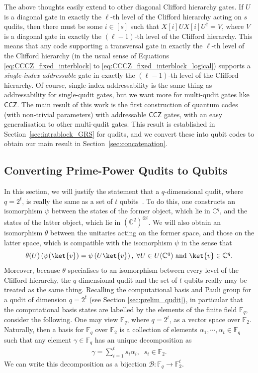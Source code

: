 \documentclass[11pt]{article}
\theoremstyle{definition}
\newcommand{\CCZ}{\mathsf{CCZ}}
\newcommand{\al}{\alpha}
\newcommand{\FF}{\mathbb{F}}
\newcommand{\B}{\mathcal{B}}
\begin{document}
The above thoughts easily extend to other diagonal Clifford hierarchy gates. If $U$ is a diagonal gate in exactly the $\ell$-th level of the Clifford hierarchy acting on $s$ qudits, then there must be some $i \in [s]$ such that $X[i]UX[i]U^\dagger = V$, where $V$ is a diagonal gate in exactly the $(\ell-1)$-th level of the Clifford hierarchy. This means that any code supporting a transversal gate in exactly the $\ell$-th level of the Clifford hierarchy (in the usual sense of Equations \eqref{eq:CCCZ_fixed_interblock} to \eqref{eq:CCCZ_fixed_interblock_logical}) supports a \textit{single-index addressable} gate in exactly the $(\ell-1)$-th level of the Clifford hierarchy. Of course, single-index addressability is the same thing as addressability for single-qudit gates, but we want more for multi-qudit gates like $\CCZ$. The main result of this work is the first construction of quantum codes (with non-trivial parameters) with addressable $\CCZ$ gates, with an easy generalisation to other multi-qudit gates. This result is established in Section~\ref{sec:intrablock_GRS} for qudits, and we convert these into qubit codes to obtain our main result in Section~\ref{sec:concatenation}.

\subsection{Converting Prime-Power Qudits to Qubits}\label{sec:qudit_to_qubit_prelim}

In this section, we will justify the statement that a $q$-dimensional qudit, where $q=2^t$, is really the same as a set of $t$ qubits~\cite{gottesman2016surviving}. To do this, one constructs an isomorphism $\psi$ between the states of the former object, which lie in $\mathbb{C}^q$, and the states of the latter object, which lie in $(\mathbb{C}^2)^{\otimes t}$. We will also obtain an isomorphism $\theta$ between the unitaries acting on the former space, and those on the latter space, which is compatible with the isomorphism $\psi$ in the sense that
\begin{equation}
    \theta(U)\left(\psi(\ket{v}\right) = \psi\left(U\ket{v}\right), \; \forall U \in U(\mathbb{C}^q) \text{ and } \ket{v} \in \mathbb{C}^q.
\end{equation}
Moreover, because $\theta$ specialises to an isomorphism between every level of the Clifford hierarchy, the $q$-dimensional qudit and the set of $t$ qubits really may be treated as the same thing. Recalling the computational basis and Pauli group for a qudit of dimension $q=2^t$ (see Section \ref{sec:prelim_qudit}), in particular that the computational basis states are labelled by the elements of the finite field $\mathbb{F}_q$, consider the following. One may view $\FF_q$, where $q = 2^t$, as a vector space over $\FF_2$. Naturally, then a basis for $\FF_q$ over $\FF_2$ is a collection of elements $\al_1,\cdots, \al_t\in \FF_q$ such that any element $\gamma\in \FF_q$ has an unique decomposition as 
\begin{align}
    \gamma = \sum_{i=1}^t s_i \al_i,\;\; s_i\in \FF_2.
\end{align}
We can write this decomposition as a bijection $\B:\FF_q\rightarrow \FF_2^t$.
\end{document}
